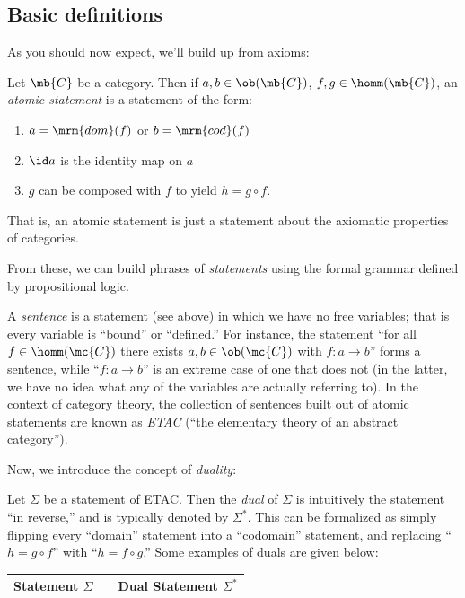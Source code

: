 \documentclass{fkbook}
\theoremstyle{snazzydefinition}
\renewcommand{\dom}{\mrm{dom}}
\renewcommand{\cod}{\mrm{cod}}
\begin{document}
\begin{adjustwidth}{1em}{1em}
  \subsection{Basic definitions}
  As you should now expect, we'll build up from axioms:
  \begin{definition}
    Let $\mb{C}$ be a category. Then if $a,b \in \ob(\mb{C})$, $f,g
    \in \homm(\mb{C})$, an \emph{atomic statement} is a statement of
    the form:
    \begin{enumerate}
      \item $a = \dom(f)$ or $b = \cod(f)$
      \item $\id a$ is the identity map on $a$
      \item $g$ can be composed with $f$ to yield $h = g \circ f$.
    \end{enumerate}
    That is, an atomic statement is just a statement about the
    axiomatic properties of categories.
  \end{definition}
  From these, we can build phrases of \emph{statements} using the
  formal grammar defined by propositional logic.
  \begin{definition}[Sentences]
    A \emph{sentence} is a statement (see above) in which we have no
    free variables; that is every variable is ``bound'' or
    ``defined.'' For instance, the statement ``for all $f \in
    \homm(\mc{C})$ there exists $a,b \in \ob(\mc{C})$ with $f : a \to
    b$'' forms a sentence, while ``$f : a \to b$'' is an extreme case
    of one that does not (in the latter, we have no idea what any of
    the variables are actually referring to). In the context of
    category theory, the collection of sentences built out of atomic
    statements are known as \emph{ETAC} (``the elementary theory of an
    abstract category'').
  \end{definition}
  Now, we introduce the concept of \emph{duality}:
  \begin{definition}[Duality]
    Let $\Sigma$ be a statement of ETAC. Then the \emph{dual} of
    $\Sigma$ is intuitively the statement ``in reverse,'' and is
    typically denoted by $\Sigma^*$. This can be formalized as simply
    flipping every ``domain'' statement into a ``codomain'' statement,
    and replacing ``$h = g \circ f$'' with ``$h = f \circ g$.'' Some
    examples of duals are given below:
    \begin{table}[H]
      \centering
      \begin{tabular}{@{}lll@{}}
        \toprule
        Statement $\Sigma$ && Dual Statement $\Sigma^*$ \\ \midrule

\end{tabular}
\end{table}
\end{definition}
\end{adjustwidth}
\end{document}
